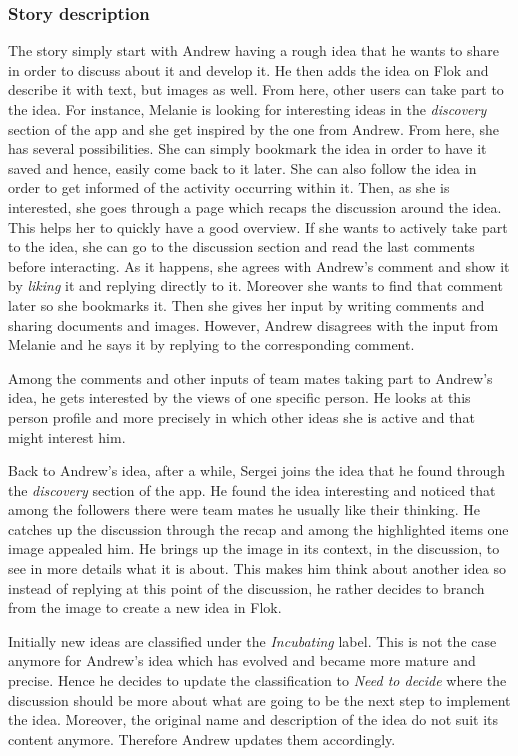 \documentclass[a4paper,12pt, oneside]{article}
\begin{document}
\subsubsection*{Story description}
The story simply start with Andrew having a rough idea that he wants to share in order to discuss about it and develop it.
He then adds the idea on Flok and describe it with text, but images as well.
From here, other users can take part to the idea. For instance, Melanie is looking for interesting ideas in the \emph{discovery} section of the app and she get inspired by the one from Andrew.
From here, she has several possibilities.
She can simply bookmark the idea in order to have it saved and hence, easily come back to it later.
She can also follow the idea in order to get informed of the activity occurring within it.
Then, as she is interested, she goes through a page which recaps the discussion around the idea.
This helps her to quickly have a good overview.
If she wants to actively take part to the idea, she can go to the discussion section and read the last comments before interacting.
As it happens, she agrees with Andrew's comment and show it by \emph{liking} it and replying directly to it.
Moreover she wants to find that comment later so she bookmarks it.
Then she gives her input by writing comments and sharing documents and images.
However, Andrew disagrees with the input from Melanie and he says it by replying to the corresponding comment.

Among the comments and other inputs of team mates taking part to Andrew's idea, he gets interested by the views of one specific person.
He looks at this person profile and more precisely in which other ideas she is active and that might interest him.

Back to Andrew's idea, after a while, Sergei joins the idea that he found through the \emph{discovery} section of the app.
He found the idea interesting and noticed that among the followers there were team mates he usually like their thinking.
He catches up the discussion through the recap and among the highlighted items one image appealed him.
He brings up the image in its context, in the discussion, to see in more details what it is about.
This makes him think about another idea so instead of replying at this point of the discussion, he rather decides to branch from the image to create a new idea in Flok.

Initially new ideas are classified under the \emph{Incubating} label.
This is not the case anymore for Andrew's idea which has evolved and became more mature and precise.
Hence he decides to update the classification to \emph{Need to decide} where the discussion should be more about what are going to be the next step to implement the idea.
Moreover, the original name and description of the idea do not suit its content anymore.
Therefore Andrew updates them accordingly.
\end{document}
